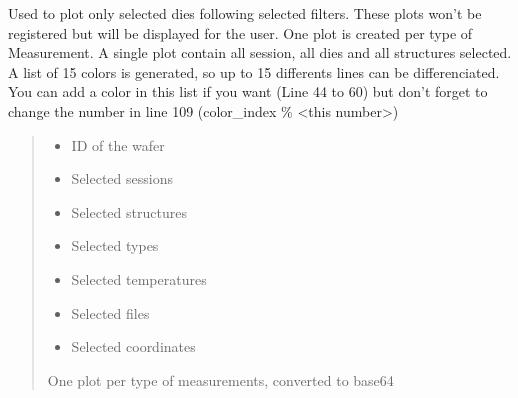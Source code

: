 \documentclass[letterpaper,10pt,english]{sphinxmanual}
\begin{document}
\begin{fulllineitems}
\label{\detokenize{plot_and_powerpoint:plot_and_powerpoint.plot_wanted_matrices}}
\pysigstartsignatures
{}
\pysigstopsignatures
\sphinxAtStartPar
Used to plot only selected dies following selected filters. These plots won’t be registered but will be displayed for the user.
One plot is created per type of Measurement.
A single plot contain all session, all dies and all structures selected. A list of 15 colors is generated, so up to 15 differents lines can be differenciated.
You can add a color in this list if you want (Line 44 to 60) but don’t forget to change the number in line 109 (color\_index \% \textless{}this number\textgreater{})
\begin{quote}\begin{description}
\begin{itemize}
\item {} 
\sphinxAtStartPar
{} \textendash{} ID of the wafer

\item {} 
\sphinxAtStartPar
{} \textendash{} Selected sessions

\item {} 
\sphinxAtStartPar
{} \textendash{} Selected structures

\item {} 
\sphinxAtStartPar
{} \textendash{} Selected types

\item {} 
\sphinxAtStartPar
{} \textendash{} Selected temperatures

\item {} 
\sphinxAtStartPar
{} \textendash{} Selected files

\item {} 
\sphinxAtStartPar
{} \textendash{} Selected coordinates

\end{itemize}

\sphinxAtStartPar
One plot per type of measurements, converted to base64

\end{description}\end{quote}

\end{fulllineitems}
\end{document}

